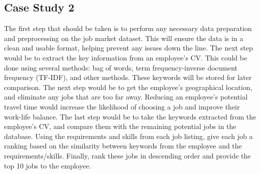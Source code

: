 \documentclass[twoside, 12pt, a4paper]{article}
\begin{document}
\subsection{Case Study 2}

The first step that should be taken is to perform any necessary data preparation and preprocessing on the job market dataset. This will ensure the data is in a clean and usable format, helping prevent any issues down the line. The next step would be to extract the key information from an employee's CV. This could be done using several methods: bag of words, term frequency-inverse document frequency (TF-IDF), and other methods. These keywords will be stored for later comparison. The next step would be to get the employee's geographical location, and eliminate any jobs that are too far away. Reducing an employee's potential travel time would increase the likelihood of choosing a job and improve their work-life balance. The last step would be to take the keywords extracted from the employee's CV, and compare them with the remaining potential jobs in the database. Using the requirements and skills from each job listing, give each job a ranking based on the similarity between keywords from the employee and the requirements/skills. Finally, rank these jobs in descending order and provide the top 10 jobs to the employee.
\end{document}
